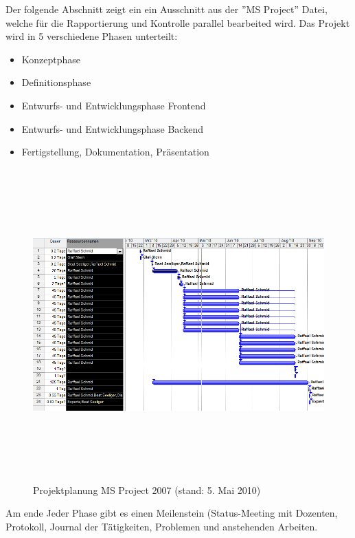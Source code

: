 \begin{landscape}
\pagestyle{empty}
Der folgende Abschnitt zeigt ein ein Ausschnitt aus der ''MS Project'' Datei, welche f\"ur die Rapportierung und Kontrolle parallel bearbeited wird. Das Projekt wird in 5 verschiedene Phasen unterteilt: 
\begin{itemize}
\item Konzeptphase
\item Definitionsphase
\item Entwurfs- und Entwicklungsphase Frontend
\item Entwurfs- und Entwicklungsphase Backend
\item Fertigstellung, Dokumentation, Pr\"asentation

\end{itemize}
\begin{figure}[h]
	\centering
	\includegraphics[height=12cm]{orgchart/projectplanning_msproject}
	\caption[Projektplanung MS Project 2007 (stand: 5. Mai 2010)]{Projektplanung MS Project 2007 (stand: 5. Mai 2010)}
\end{figure}
\end{landscape}
Am ende Jeder Phase gibt es einen Meilenstein (Status-Meeting mit Dozenten, Protokoll, Journal der T\"atigkeiten, Problemen und anstehenden Arbeiten.